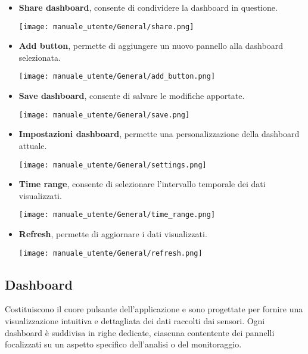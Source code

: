 \begin{itemize}
    \item \textbf{Share dashboard}, consente di condividere la dashboard in questione.
        \begin{center}
            \texttt{[image: manuale\_utente/General/share.png]}
        \end{center}
    \item \textbf{Add button}, permette di aggiungere un nuovo pannello alla dashboard selezionata.
        \begin{center}
            \texttt{[image: manuale\_utente/General/add\_button.png]}
        \end{center}
    \item \textbf{Save dashboard}, consente di salvare le modifiche apportate.
        \begin{center}
            \texttt{[image: manuale\_utente/General/save.png]}
        \end{center}
    \newpage
    \item \textbf{Impostazioni dashboard}, permette una personalizzazione della dashboard attuale.
        \begin{center}
            \texttt{[image: manuale\_utente/General/settings.png]}
        \end{center}
    \item \textbf{Time range}, consente di selezionare l'intervallo temporale dei dati visualizzati.
        \begin{center}
            \texttt{[image: manuale\_utente/General/time\_range.png]}
        \end{center}
    \item \textbf{Refresh}, permette di aggiornare i dati visualizzati.
        \begin{center}
            \texttt{[image: manuale\_utente/General/refresh.png]}
        \end{center}
\end{itemize}

\subsection{Dashboard}
Costituiscono il cuore pulsante dell'applicazione e sono progettate per fornire una visualizzazione intuitiva e dettagliata dei dati raccolti dai sensori. Ogni dashboard è suddivisa in righe dedicate, ciascuna contentente dei pannelli focalizzati su un aspetto specifico dell'analisi o del monitoraggio.

